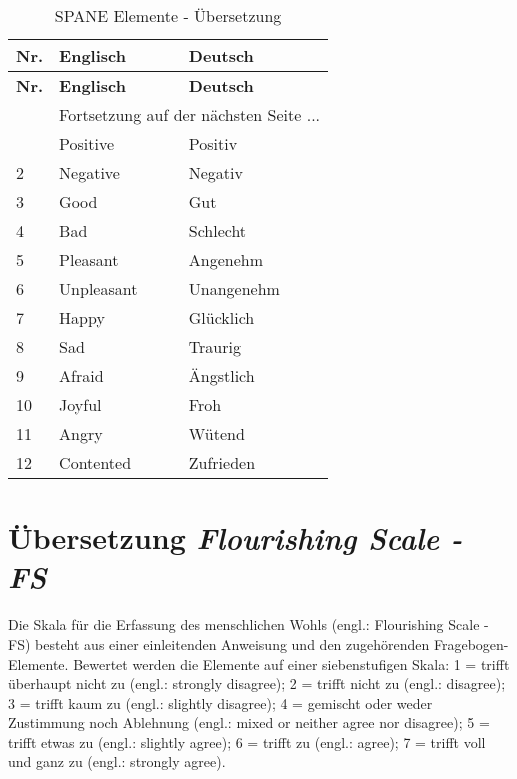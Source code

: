 \begin{center}
    \begin{longtable}[t]{|p{0.8 cm}|p{6.6 cm}|p{6.6 cm}|}
    \caption{SPANE Elemente - Übersetzung} \\ \hline
        \textbf{Nr.} & \textbf{Englisch} & \textbf{Deutsch} \\ \hline
        \endfirsthead
        \hline
        \textbf{Nr.} & \textbf{Englisch} & \textbf{Deutsch} \\ \hline
        \endhead 
        & \multicolumn{2}{|c|}{Fortsetzung auf der nächsten Seite $...$ } \\ \hline
        \endfoot
        \hline
        \endlastfoot
        1 & Positive & Positiv\\
        2 & Negative & Negativ\\
        3 & Good & Gut\\
        4 & Bad & Schlecht\\
        5 & Pleasant & Angenehm\\
        6 & Unpleasant & Unangenehm\\
        7 & Happy & Glücklich\\
        8 & Sad & Traurig\\
        9 & Afraid & Ängstlich\\
        10 & Joyful & Froh\\
        11 & Angry & Wütend\\
        12 & Contented & Zufrieden\\  
    \end{longtable}
	\label{tab:SpaneElemente}
\end{center}

\section{Übersetzung \textit{Flourishing Scale - FS}}\label{appendix.fs}
Die Skala für die Erfassung des menschlichen Wohls (engl.: Flourishing Scale - FS) \cite{Diener:2010} besteht aus einer einleitenden Anweisung und den zugehörenden Fragebogen-Elemente. Bewertet werden die Elemente auf einer siebenstufigen Skala: 1 = trifft überhaupt nicht zu (engl.: strongly disagree); 2 = trifft nicht zu (engl.: disagree); 3 = trifft kaum zu (engl.: slightly disagree); 4 = gemischt oder weder Zustimmung noch Ablehnung (engl.: mixed or neither agree nor disagree); 5 = trifft etwas zu (engl.: slightly agree); 6 = trifft zu (engl.: agree); 7 = trifft voll und ganz zu (engl.: strongly agree).


